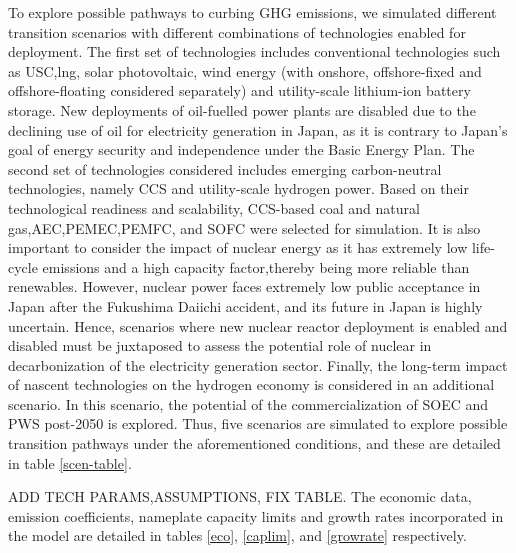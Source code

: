 To explore possible pathways to curbing \gls{GHG} emissions, we simulated different transition scenarios with different combinations of technologies enabled for deployment. The first set of technologies includes conventional technologies such as  \gls{USC},\gls{lng}, solar photovoltaic, wind energy (with onshore, offshore-fixed and offshore-floating considered separately) and utility-scale lithium-ion battery storage. New deployments of oil-fuelled power plants are disabled due to the declining use of oil for electricity generation in Japan, as it is contrary to Japan's goal of energy security and independence under the Basic Energy Plan. The second set of technologies considered includes emerging carbon-neutral technologies, namely \gls{CCS} and utility-scale hydrogen power. Based on their technological readiness and scalability, \gls{CCS}-based coal and natural gas,\gls{AEC},\gls{PEMEC},\gls{PEMFC}, and \gls{SOFC} were selected for simulation. It is also important to consider the impact of nuclear energy as it has extremely low life-cycle emissions and a high capacity factor,thereby being more reliable than renewables. However, nuclear power faces extremely low public acceptance in Japan after the Fukushima Daiichi accident, and its future in Japan is highly uncertain. Hence, scenarios where new nuclear reactor deployment is enabled and disabled must be juxtaposed to assess the potential role of nuclear in decarbonization of the electricity generation sector. Finally, the long-term impact of nascent technologies on the hydrogen economy is considered in an additional scenario. In this scenario, the potential of the commercialization of \gls{SOEC} and \gls{PWS} post-2050 is explored. Thus, five scenarios are simulated to explore possible transition pathways under the aforementioned conditions, and these are detailed in table \ref{scen-table}.

ADD TECH PARAMS,ASSUMPTIONS, FIX TABLE.
The economic data, emission coefficients, nameplate capacity limits and growth rates incorporated in the model are detailed in tables \ref{eco}, \ref{caplim}, and \ref{growrate} respectively. 



